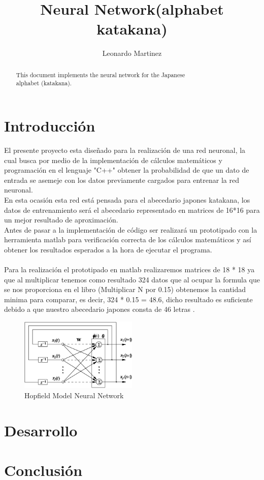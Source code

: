 \documentclass[10pt]{article}         %
\title{Neural Network(alphabet katakana)}
\author{Leonardo Martinez}
\begin{document}
\maketitle

\begin{abstract}
This document implements the neural network for the Japanese \\ alphabet (katakana).
\end{abstract}

\section{Introducción}
El presente proyecto esta diseñado para la realización de una red neuronal, la cual busca por medio de la implementación de cálculos matemáticos y \\programación en el lenguaje "C++" obtener la probabilidad de que un dato de entrada se asemeje con los datos previamente cargados para entrenar la red neuronal.\\
En esta ocasión esta red está pensada para el abecedario japones katakana, los datos de entrenamiento será el abecedario representado en matrices de 16*16 para un mejor resultado de aproximación.\\
Antes de pasar a la implementación de código ser realizará un prototipado con la herramienta matlab para verificación correcta de los cálculos matemáticos y así obtener los resultados esperados a la hora de ejecutar el programa.\\
\\
Para la realización el prototipado en matlab realizaremos matrices de 18 * 18 ya que al multiplicar tenemos como resultado 324 datos que al ocupar la formula que se nos proporciona en el libro (Multiplicar N por 0.15) obtenemos la cantidad minima para comparar, es decir, 324 * 0.15 = 48.6, dicho resultado es suficiente debido a que nuestro abecedario japones consta de 46 letras .   	

\begin{figure}[htb]
\centering
\includegraphics[width=0.5\textwidth]{hopfield.png}
\caption{Hopfield Model Neural Network}
\label{fig:tigre}
\end{figure}





\section{Desarrollo}



\section{Conclusión}


	
\end{document}
